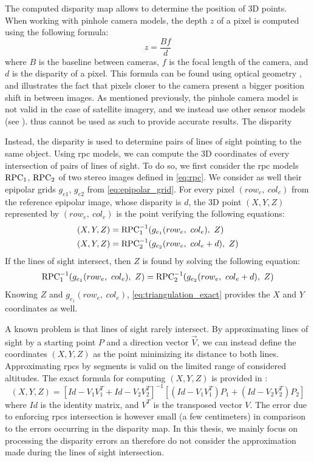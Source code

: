 The computed disparity map allows to determine the position of 3D points. When working with pinhole camera models, the depth $z$ of a pixel is computed using the following formula:
\begin{equation}
	z=\frac{Bf}{d}\label{eq:z_bfd}
\end{equation}
where $B$ is the baseline between cameras, $f$ is the focal length of the camera, and $d$ is the disparity of a pixel. This formula can be found using optical geometry \cite{bolles_epipolar-plane_1987}, and illustrates the fact that pixels closer to the camera present a bigger position shift in between images. As mentioned previously, the pinhole camera model is not valid in the case of satellite imagery,  and we instead use other sensor models (see ).  thus cannot be used as such to provide accurate results. The disparity 

Instead, the disparity is used to determine pairs of lines of sight pointing to the same object. Using \acrshort{rpc} models, we can compute the 3D coordinates of every intersection of pairs of lines of sight. To do so, we first consider the \acrshort{rpc} models $\mathrm{RPC}_1$, $\mathrm{RPC}_2$ of two stereo images defined in \cref{eq:rpc}. We consider as well their epipolar grids $g_{e1}$, $g_{e2}$ from \cref{eq:epipolar_grid}. For every pixel $(row_e, ~col_e)$ from the reference epipolar image, whose disparity is $d$, the 3D point $(X, Y, Z)$ represented by $(row_e, ~col_e)$ is the point verifying the following equations:
\begin{align}
    (X, Y, Z) &= \mathrm{RPC}^{-1}_1(g_{e_1}(row_e,~col_e),~Z)\label{eq:triangulation_exact}\\
    (X, Y, Z) &= \mathrm{RPC}^{-1}_2(g_{e_2}(row_e,~col_e+d),~Z) 
\end{align}
If the lines of sight intersect, then $Z$ is found by solving the following equation:
\begin{equation}
     \mathrm{RPC}^{-1}_1(g_{e_1}(row_e,~col_e),~Z) = \mathrm{RPC}^{-1}_2(g_{e_2}(row_e,~col_e+d),~Z) 
\end{equation}
Knowing $Z$ and $g_{e_1}(row_e,~col_e)$, \cref{eq:triangulation_exact} provides the $X$ and $Y$ coordinates as well.

A known problem is that lines of sight rarely intersect. By approximating lines of sight by a starting point $P$ and a direction vector $\overrightarrow{V}$, we can instead define the coordinates $(X,Y,Z)$ as the point minimizing its distance to both lines. Approximating \acrshort{rpc}s by segments is valid on the limited range of considered altitudes. The exact formula for computing $(X,Y,Z)$ is provided in \cite{delvit_geometric_2006}:
\begin{equation}
    (X,Y,Z) = \left[ Id - V_1V_1^T + Id - V_2V_2^T \right]^{-1} \left[ (Id - V_1V_1^T)P_1 + (Id - V_2V_2^T)P_2 \right]
\end{equation}
where $Id$ is the identity matrix, and $V^T$ is the transposed vector $V$. The error due to enforcing \acrshort{rpc}s  intersection is however small (a few centimeters) in comparison to the errors occurring in the disparity map. In this thesis, we mainly focus on processing the disparity errors an therefore do not consider the approximation made during the lines of sight intersection.

